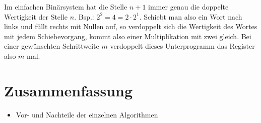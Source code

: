 \documentclass[fleqn, a4paper, 11pt]{article}       %
\begin{document}
Im einfachen Binärsystem hat die Stelle $n+1$ immer genau die doppelte Wertigkeit der Stelle $n$. Bsp.: $2^2 = 4 = 2 \cdot 2^1$. Schiebt man also ein Wort nach links und füllt rechts mit Nullen auf, so verdoppelt sich die Wertigkeit des Wortes mit jedem Schiebevorgang, kommt also einer Multiplikation mit zwei gleich. Bei einer gewünschten Schrittweite $m$ verdoppelt dieses Unterprogramm das Register also $m$-mal.


\section{Zusammenfassung}

\begin{itemize}
    \item Vor- und Nachteile der einzelnen Algorithmen
\end{itemize}




%

\newpage
\appendix %
\end{document}
